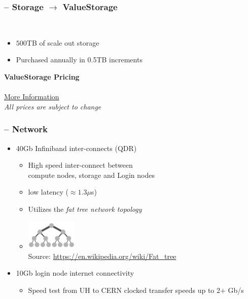 \begin{frame}
	\frametitle{{\craycs} -- Storage $\rightarrow$ ValueStorage}
        ~\\
	\begin{itemize}
		\item $500$TB of scale out storage
		\item Purchased annually in 0.5TB increments 
	\end{itemize}
	\btVFill

	\begin{center}
	\textbf{ValueStorage Pricing}~\\ 
		~\\ \href{http://www.hawaii.edu/its/value-storage-pricing/}{More Information}
		~\\	{\footnotesize \emph{All prices are subject to change}}
	\end{center}
\end{frame}


\begin{frame}
	\frametitle{{\craycs} -- Network}
	\begin{itemize}
		\item 40Gb Infiniband inter-connects (QDR)
		\begin{itemize}
			\item High speed inter-connect between~\\compute nodes, {\lustre} storage and Login nodes
                        \item low latency ($\approx1.3\mu$s)
			\item Utilizes the \emph{fat tree network topology}
			\item[] \includegraphics[width=0.20\textwidth]{images/Fat_tree_network} \\[-1ex] {\fontsize{3}{4} \selectfont Source: \url{https://en.wikipedia.org/wiki/Fat_tree} } 		
		\end{itemize}
		\item 10Gb login node internet connectivity
		\begin{itemize}
			\item Speed test from UH to CERN clocked transfer speeds up to 2$+$ Gb/s
		\end{itemize}	
	\end{itemize}
\end{frame}


